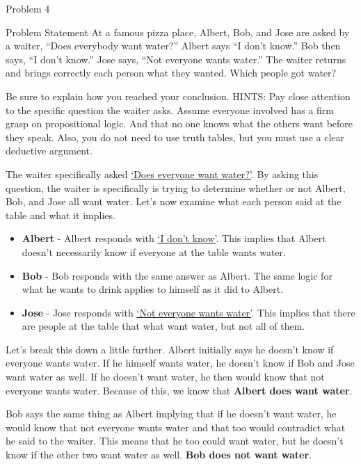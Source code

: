 \begin{problem}{Problem 4}
    \begin{statement}{Problem Statement}
        At a famous pizza place, Albert, Bob, and Jose are asked by a waiter, “Does everybody want water?” Albert says “I don’t know.”  Bob then says, “I don’t know.” Jose says, “Not everyone wants water.” 
        The waiter returns and brings correctly each person what they wanted.  Which people got water?

        Be sure to explain how you reached your conclusion. HINTS: Pay close attention to the specific question the waiter asks.  Assume everyone involved has a firm grasp on propositional logic. And that no 
        one knows what the others want before they speak. Also, you do not need to use truth tables, but you must use a clear deductive argument.
    \end{statement}

    \begin{highlight}[Solution]
        The waiter specifically asked \underline{`Does everyone want water?'}. By asking this question, the waiter is specifically is trying to determine whether or not Albert, Bob, and Jose all want water.
        Let's now examine what each person said at the table and what it implies.

        \begin{itemize}
            \item \textbf{Albert} - Albert responds with \underline{`I don't know'}. This implies that Albert doesn't necessarily know if everyone at the table wants water.
            \item \textbf{Bob} - Bob responds with the same answer as Albert. The same logic for what he wants to drink applies to himself as it did to Albert.
            \item \textbf{Jose} - Jose responds with \underline{`Not everyone wants water'}. This implies that there are people at the table that what want water, but not all of them.
        \end{itemize}

        Let's break this down a little further. Albert initially says he doesn't know if everyone wants water. If he himself wants water, he doesn't know if Bob and Jose want water as well. If he doesn't
        want water, he then would know that not everyone wants water. Because of this, we know that \textbf{Albert does want water}.

        Bob says the same thing as Albert implying that if he doesn't want water, he would know that not everyone wants water and that too would contradict what he said to the waiter. This means that he too could
        want water, but he doesn't know if the other two want water as well. \textbf{Bob does not want water}.


\end{highlight}
\end{problem}
